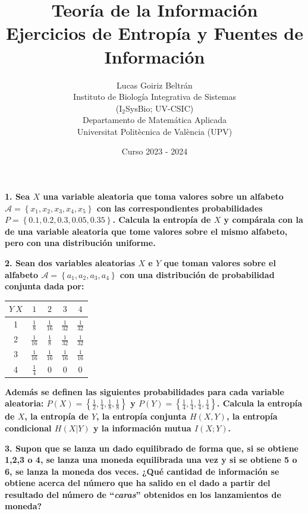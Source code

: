 \documentclass{article}
\title{Teoría de la Información\\Ejercicios de Entropía y Fuentes de Información}
\date{Curso 2023 - 2024}
\author{Lucas Goiriz Beltrán\\ Instituto de Biología Integrativa de Sistemas\\(I$_2$SysBio; UV-CSIC)\\Departamento de Matemática Aplicada\\Universitat Politècnica de València (UPV)}
\begin{document}
\maketitle

\textbf{
1. Sea $X$ una variable aleatoria que toma valores sobre un alfabeto $\mathcal{A} = \left\{x_1,x_2,x_3,x_4,x_5\right\}$ con las correspondientes probabilidades $P = \left\{0.1,0.2,0.3,0.05,0.35\right\}$. Calcula la entropía de $X$ y compárala con la de una variable aleatoria que tome valores sobre el mismo alfabeto, pero con una distribución uniforme.
}

\vspace{1cm}

\textbf{
2. Sean dos variables aleatorias $X$ e $Y$ que toman valores sobre el alfabeto $\mathcal{A} = \left\{a_1,a_2,a_3,a_4\right\}$ con una distribución de probabilidad conjunta dada por:
}

\begin{table}[htbp!]
\centering
\begin{tabular}{|c|c|c|c|c|}
    \hline
    $Y \ X$ & $1$ & $2$ & $3$ & $4$ \\
    \hline
    1 & $\frac{1}{8}$ & $\frac{1}{16}$ & $\frac{1}{32}$ & $\frac{1}{32}$ \\
    2 & $\frac{1}{16}$ & $\frac{1}{8}$ & $\frac{1}{32}$ & $\frac{1}{32}$ \\
    3 & $\frac{1}{16}$ & $\frac{1}{16}$ & $\frac{1}{16}$ & $\frac{1}{16}$ \\
    4 & $\frac{1}{4}$ & $0$ & $0$ & $0$ \\
    \hline
\end{tabular}
\end{table}


\textbf{
Además se definen las siguientes probabilidades para cada variable aleatoria: $P(X) = \left\{\frac{1}{2},\frac{1}{4},\frac{1}{8},\frac{1}{8}\right\}$ y $P(Y) = \left\{\frac{1}{4},\frac{1}{4},\frac{1}{4},\frac{1}{4}\right\}$. Calcula la entropía de $X$, la entropía de $Y$, la entropía conjunta $H(X,Y)$, la entropía condicional $H(X|Y)$ y la información mutua $I(X;Y)$.
}

\vspace{1cm}

\textbf{
3. Supon que se lanza un dado equilibrado de forma que, si se obtiene 1,2,3 o 4, se lanza una moneda equilibrada una vez y si se obtiene 5 o 6, se lanza la moneda dos veces. ¿Qué cantidad de información se obtiene acerca del número que ha salido en el dado a partir del resultado del número de ``\textit{caras}'' obtenidos en los lanzamientos de moneda?
}
\end{document}

